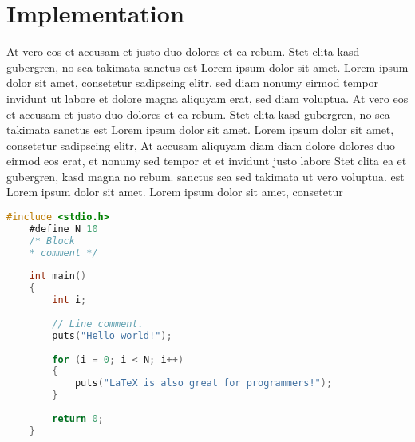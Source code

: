 \chapter{Implementation}

At vero eos et accusam et justo duo dolores et ea rebum. Stet clita kasd gubergren, no sea takimata sanctus est Lorem ipsum dolor sit amet. Lorem ipsum dolor sit amet, consetetur sadipscing elitr, sed diam nonumy eirmod tempor invidunt ut labore et dolore magna aliquyam erat, sed diam voluptua. At vero eos et accusam et justo duo dolores et ea rebum. Stet clita kasd gubergren, no sea takimata sanctus est Lorem ipsum dolor sit amet. Lorem ipsum dolor sit amet, consetetur sadipscing elitr, At accusam aliquyam diam diam dolore dolores duo eirmod eos erat, et nonumy sed tempor et et invidunt justo labore Stet clita ea et gubergren, kasd magna no rebum. sanctus sea sed takimata ut vero voluptua. est Lorem ipsum dolor sit amet. Lorem ipsum dolor sit amet, consetetur

\begin{lstlisting}[language=C, caption=Example]
	#include <stdio.h>
	#define N 10
	/* Block
	* comment */
	
	int main()
	{
		int i;
		
		// Line comment.
		puts("Hello world!");
		
		for (i = 0; i < N; i++)
		{
			puts("LaTeX is also great for programmers!");
		}
		
		return 0;
	}
\end{lstlisting}